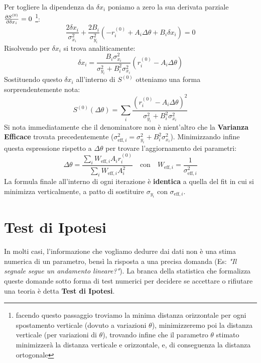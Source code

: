 \documentclass[openany,a4paper,12pt]{book}
\theoremstyle{remark}
\begin{document}
Per togliere la dipendenza da $\delta x_i$ poniamo a zero la sua derivata parziale $\pderivative{S^{(0)}}{\delta x_i} = 0$ \footnote{facendo questo passaggio troviamo la minima distanza orizzontale per ogni spostamento verticale (dovuto a variazioni $\theta$), minimizzeremo poi la distanza verticale (per variazioni di $\theta$), trovando infine che il parametro $\theta$ stimato 
minimizzerà la distanza verticale e orizzontale, e, di conseguenza
la distanza ortogonale}:
\begin{equation*}
    \frac{2\delta x_i}{\sigma_{x_i}^2} + \frac{2 B_i}{\sigma_{y_i}^2}( -r_i^{(0)} + A_i \Delta\theta + B_i \delta x_i ) = 0
\end{equation*}
Risolvendo per $\delta x_i$ si trova analiticamente:
\begin{equation*}
    \delta x_i = \frac{B_i \sigma_{x_i}^2}{\sigma_{y_i}^2 + B_i^2 \sigma_{x_i}^2} (r_i^{(0)} - A_i \Delta\theta)
\end{equation*}
Sostituendo questo $\delta x_i$ all'interno di $S^{(0)}$ otteniamo una forma sorprendentemente nota:
\begin{equation}
    S^{(0)}(\Delta\theta) = \sum_{i} \frac{(r_i^{(0)} - A_i \Delta\theta)^2}{\sigma_{y_i}^2 + B_i^2 \sigma_{x_i}^2}
\end{equation}
Si nota immediatamente che il denominatore non è nient'altro che la \textbf{Varianza Efficace} trovata precedentemente ($\sigma_{\text{eff}, i}^2 = \sigma_{y_i}^2 + B_i^2 \sigma_{x_i}^2$). Minimizzando infine questa espressione rispetto a $\Delta\theta$ per trovare l'aggiornamento dei parametri:
\begin{equation}
    \Delta\theta = \frac{\sum_i W_{\text{eff}, i} A_i r_i^{(0)}}{\sum_i W_{\text{eff}, i} A_i^2} \quad \text{con} \quad W_{\text{eff}, i} = \frac{1}{\sigma_{\text{eff}, i}^2}
\end{equation}
La formula finale all'interno di ogni iterazione è \textbf{identica} a quella del fit in cui si minimizza verticalmente, a patto di sostituire $\sigma_{y_i}$ con $\sigma_{\text{eff}, i}$.



\section{Test di Ipotesi}

In molti casi, l'informazione che vogliamo dedurre dai dati non è una stima numerica di un parametro, bensì la risposta a una precisa domanda (Es: \textit{"Il segnale segue un andamento lineare?"}). La branca della statistica che formalizza queste domande sotto forma di test numerici per decidere se accettare o rifiutare una teoria è detta \textbf{Test di Ipotesi}.
\end{document}
